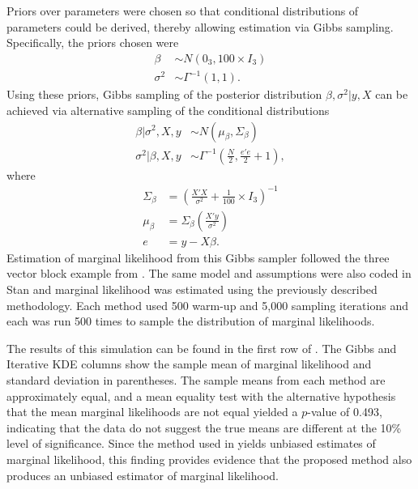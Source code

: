 \documentclass[twocolumn]{article}
\begin{document}
Priors over parameters were chosen so that conditional distributions of parameters could be derived, thereby allowing estimation via Gibbs sampling. Specifically, the priors chosen were
\begin{subequations}
\begin{align}
	\beta &\sim N(0_3, 100\times I_3)\\
	\sigma^2 &\sim \Gamma^{-1}(1, 1).
\end{align}
\end{subequations}
Using these priors, Gibbs sampling of the posterior distribution $\beta, \sigma^2|y, X$ can be achieved via alternative sampling of the conditional distributions
\begin{subequations}
\begin{align}
	\beta|\sigma^2, X, y &\sim N(\mu_\beta, \Sigma_\beta) \\
	\sigma^2|\beta, X, y &\sim \Gamma^{-1}\left(\frac{N}2, \frac{e'e}2 + 1\right),
\end{align}
\end{subequations}
where
\begin{subequations}
\begin{align}
	\Sigma_\beta &= \left(\frac{X'X}{\sigma^2} + \frac1{100}\times I_3\right)^{-1}\\
	\mu_\beta &= \Sigma_\beta\left(\frac{X'y}{\sigma^2}\right)\\
	e &= y - X\beta.
\end{align}
\end{subequations}
Estimation of marginal likelihood from this Gibbs sampler followed the three vector block example from \cite{Chib}. The same model and assumptions were also coded in Stan and marginal likelihood was estimated using the previously described methodology. Each method used 500 warm-up and 5,000 sampling iterations and each was run 500 times to sample the distribution of marginal likelihoods.

The results of this simulation can be found in the first row of . The Gibbs and Iterative KDE columns show the sample mean of marginal likelihood and standard deviation in parentheses. The sample means from each method are approximately equal, and a mean equality test with the alternative hypothesis that the mean marginal likelihoods are not equal yielded a $p$-value of 0.493, indicating that the data do not suggest the true means are different at the 10\% level of significance. Since the method used in \cite{Chib} yields unbiased estimates of marginal likelihood, this finding provides evidence that the proposed method also produces an unbiased estimator of marginal likelihood.
\end{document}
